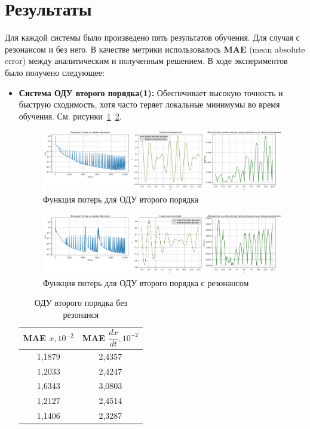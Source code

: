 \documentclass[12pt,a4paper]{article}
\begin{document}
\newpage
\section{Результаты}
Для каждой системы было произведено пять результатов обучения. Для случая с резонансом и без него. В качестве метрики использовалось \textbf{MAE} (mean absolute error) между аналитическим и полученным решением. В ходе экспериментов было получено следующее:
\begin{itemize}

    \item \textbf{Система ОДУ второго порядка(1):} Обеспечивает высокую точность и быструю сходимость, хотя часто теряет локальные минимумы во время обучения. См. рисунки~\ref{fig:loss_second_order}~\ref{fig:loss_second_order_resonance}.

    \begin{figure}[h!]
        \centering
        \includegraphics[width=1\textwidth]{images/Loss&x_ODE_of_the_second_order.png}
        \caption{Функция потерь для ОДУ второго порядка}
        \label{fig:loss_second_order}
    \end{figure}

    \begin{figure}[h!]
        \centering
        \includegraphics[width=1\textwidth]{images/Loss&x_ODE_of_the_second_order_resonance.png}
        \caption{Функция потерь для ОДУ второго порядка с резонансом}
        \label{fig:loss_second_order_resonance}
    \end{figure}

    \begin{table}[h!]
        \centering
        \begin{tabular}{|c|c|}
        \hline
        \textbf{MAE $x, 10^{-2}$} & \textbf{MAE $\dfrac{dx}{dt}, 10^{-2}$} \\
        \hline
        1,1879 & 2,4357 \\
        1,2033 & 2,4247 \\
        1,6343 & 3,0803 \\
        1,2127 & 2,4514 \\
        1,1406 & 2,3287 \\
        \hline
        \end{tabular}
        \caption{ОДУ второго порядка без резонанся}
    \end{table}


\end{itemize}
\end{document}
